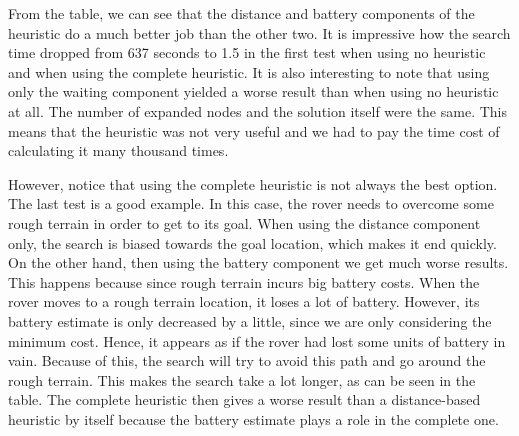 From the table, we can see that the distance and battery components of the heuristic do a much better job than
the other two. It is impressive how the search time dropped from 637 seconds to 1.5 in the first test when using
no heuristic and when using the complete heuristic. It is also interesting to note that using only the waiting
component yielded a worse result than when using no heuristic at all. The number of expanded nodes and the solution
itself were the same. This means that the heuristic was not very useful and we had to pay the time cost of
calculating it many thousand times.

However, notice that using the complete heuristic is not always the best option. The last test is a good example.
In this case, the rover needs to overcome some rough terrain in order to get to its goal. When using the distance
component only, the search is biased towards the goal location, which makes it end quickly. On the other hand,
then using the battery component we get much worse results. This happens because since rough terrain incurs
big battery costs. When the rover moves to a rough terrain location, it loses a lot of battery. However,
its battery estimate is only decreased by a little, since we are only considering the minimum cost. Hence, it
appears as if the rover had lost some units of battery in vain. Because of this, the search will try to avoid this
path and go around the rough terrain. This makes the search take a lot longer, as can be seen in the table.
The complete heuristic then gives a worse result than a distance-based heuristic by itself because the battery
estimate plays a role in the complete one.